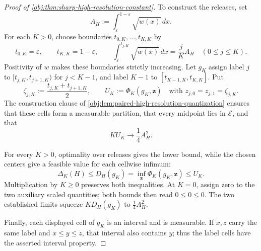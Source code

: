 \begin{proof}[Proof of \cref{obj:thm:sharp-high-resolution-constant}]
To construct the releases, set
\[
A_H:=\int_{\varepsilon}^{1-\varepsilon}\sqrt{w(x)}\,dx.
\]
For each \(K>0\), choose boundaries \(t_{0,K},\ldots,t_{K,K}\) by
\[
t_{0,K}=\varepsilon,\qquad t_{K,K}=1-\varepsilon,\qquad
\int_{\varepsilon}^{t_{j,K}}\sqrt{w(x)}\,dx=\frac{j}{K}A_H
\quad(0\leq j\leq K).
\]
Positivity of \(w\) makes these boundaries strictly increasing. Let \(g_K\) assign label \(j\) to \([t_{j,K},t_{j+1,K})\) for \(j<K-1\), and label \(K-1\) to \([t_{K-1,K},t_{K,K}]\). Put
\[
\zeta_{j,K}:=\frac{t_{j,K}+t_{j+1,K}}2,
\qquad
U_K:=\Phi_K(g_K,\mathbf z)
\quad\text{with }z_{j,0}=z_{j,1}=\zeta_{j,K}.
\]
The construction clause of \cref{obj:lem:paired-high-resolution-quantization} ensures that these cells form a measurable partition, that every midpoint lies in \(\mathcal E\), and that
\[
K U_K\longrightarrow
\frac14 A_H^2.
\]

For every \(K>0\), optimality over releases gives the lower bound, while the chosen centers give a feasible value for each cellwise infimum:
\[
\Delta_K(H)\leq D_H(g_K)
=\inf_{\mathbf z}\Phi_K(g_K,\mathbf z)
\leq U_K.
\]
Multiplication by \(K\geq0\) preserves both inequalities. At \(K=0\), assign zero to the two auxiliary scaled quantities; both bounds then read \(0\leq0\leq0\). The two established limits squeeze \(K D_H(g_K)\) to \(\frac14A_H^2\).

Finally, each displayed cell of \(g_K\) is an interval and is measurable. If \(x,z\) carry the same label and \(x\leq y\leq z\), that interval also contains \(y\); thus the label cells have the asserted interval property.
\end{proof}

